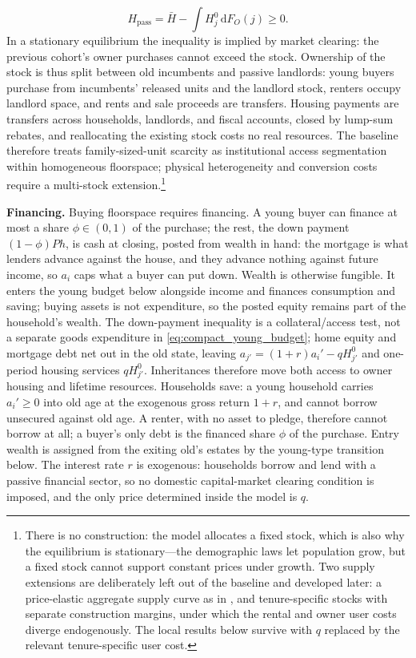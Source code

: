 \documentclass[11pt]{article}
\newcommand{\dd}{\mathrm d}
\newcommand{\1}{\mathbf 1}
\begin{document}
\[
H_{\mathrm{pass}}
=
\bar H-\int H_j^0\,\dd F_O(j)\ge0.
\]
In a stationary equilibrium the inequality is implied by market clearing: the previous cohort's owner purchases cannot exceed the stock. Ownership of the stock is thus split between old incumbents and passive landlords: young buyers purchase from incumbents' released units and the landlord stock, renters occupy landlord space, and rents and sale proceeds are transfers. Housing payments are transfers across households, landlords, and fiscal accounts, closed by lump-sum rebates, and reallocating the existing stock costs no real resources. The baseline therefore treats family-sized-unit scarcity as institutional access segmentation within homogeneous floorspace; physical heterogeneity and conversion costs require a multi-stock extension.\footnote{There is no construction: the model allocates a fixed stock, which is also why the equilibrium is stationary---the demographic laws let population grow, but a fixed stock cannot support constant prices under growth. Two supply extensions are deliberately left out of the baseline and developed later: a price-elastic aggregate supply curve as in \citet{coven2024}, and tenure-specific stocks with separate construction margins, under which the rental and owner user costs diverge endogenously. The local results below survive with $q$ replaced by the relevant tenure-specific user cost.}

\textbf{Financing.} Buying floorspace requires financing. A young buyer can finance at most a share $\phi\in(0,1)$ of the purchase; the rest, the down payment $(1-\phi)Ph$, is cash at closing, posted from wealth in hand: the mortgage is what lenders advance against the house, and they advance nothing against future income, so $a_i$ caps what a buyer can put down. Wealth is otherwise fungible. It enters the young budget below alongside income and finances consumption and saving; buying assets is not expenditure, so the posted equity remains part of the household's wealth. The down-payment inequality is a collateral/access test, not a separate goods expenditure in \eqref{eq:compact_young_budget}; home equity and mortgage debt net out in the old state, leaving $a_{j'}=(1+r)a_i'-qH_{j'}^0$ and one-period housing services $qH_{j'}^0$. Inheritances therefore move both access to owner housing and lifetime resources. Households save: a young household carries $a_i'\ge0$ into old age at the exogenous gross return $1+r$, and cannot borrow unsecured against old age. A renter, with no asset to pledge, therefore cannot borrow at all; a buyer's only debt is the financed share $\phi$ of the purchase. Entry wealth is assigned from the exiting old's estates by the young-type transition below. The interest rate $r$ is exogenous: households borrow and lend with a passive financial sector, so no domestic capital-market clearing condition is imposed, and the only price determined inside the model is $q$.
\end{document}
